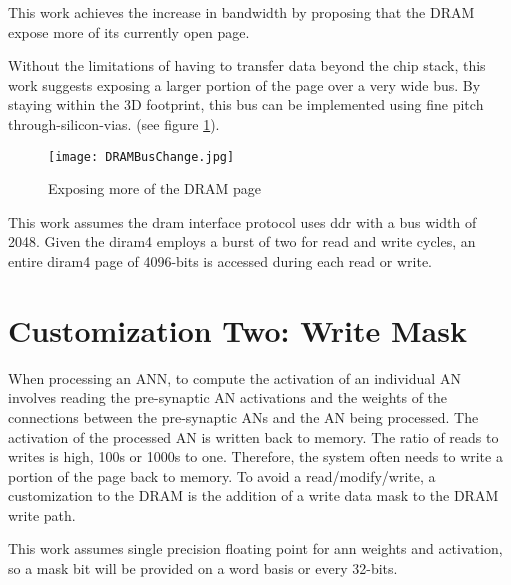 This work achieves the increase in bandwidth by proposing that the DRAM expose more of its currently open page.

Without the limitations of having to transfer data beyond the chip stack, this work suggests exposing a larger portion of the page over a very wide bus. By staying within the 3D footprint, this bus can be implemented using fine pitch through-silicon-vias.
(see figure \ref{fig:dramBusChange}).

\begin{figure}[!t]
\centering
\captionsetup{justification=centering}
\captionsetup{width=.75\linewidth}
\centerline{
\mbox{\texttt{[image: DRAMBusChange.jpg]}}
}
\caption{Exposing more of the DRAM page}
\label{fig:dramBusChange}
\end{figure}

This work assumes the \ac{dram} interface protocol uses \ac{ddr} with a bus width of 2048. Given the \ac{diram4} employs a burst of two for read and write cycles, an entire \ac{diram4} page of 4096-bits is accessed during each read or write. 

\section{Customization Two: Write Mask}
\label{sec:Write Mask}
When processing an ANN, to compute the activation of an individual AN involves reading the pre-synaptic AN activations and the weights of the connections between the pre-synaptic ANs and the AN being processed. The activation of the processed AN is written back to memory. The ratio of reads to writes is high, 100s or 1000s to one. Therefore, the system often needs to write a portion of the page back to memory. To avoid a read/modify/write, a customization to the DRAM is the addition of a write data mask to the DRAM write path.

This work assumes single precision floating point for \ac{ann} weights and activation, so a mask bit will be provided on a word basis or every 32-bits.

